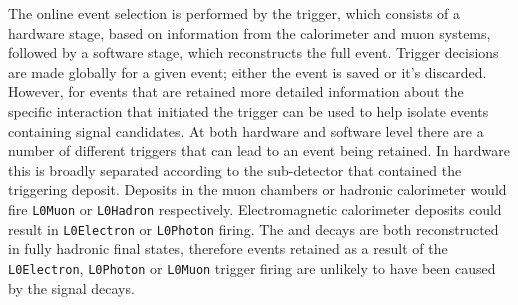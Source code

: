 The online event selection is performed by the \lhcb trigger, which consists of a hardware stage, based on information from the calorimeter and muon
systems, followed by a software stage, which reconstructs the full event.
Trigger decisions are made globally for a given event; either the event is saved or it's discarded. However, for events that are retained more detailed information about the specific interaction that initiated the trigger can be used to help isolate events containing signal candidates. At both hardware and software level there are a number of different triggers that can lead to an event being retained. In hardware this is broadly separated according to the sub-detector that contained the triggering deposit. Deposits in the muon chambers or hadronic calorimeter would fire \texttt{L0Muon} or \texttt{L0Hadron} respectively. Electromagnetic calorimeter deposits could result in \texttt{L0Electron} or \texttt{L0Photon} firing. The \decay{\Bp}{\Dsp\Kp\Km} and \decay{\Bp}{\Dsp}{\phiz} decays are both reconstructed in fully hadronic final states, therefore events retained as a result of the \texttt{L0Electron}, \texttt{L0Photon} or \texttt{L0Muon} trigger firing are unlikely to have been caused by the signal decays. 

